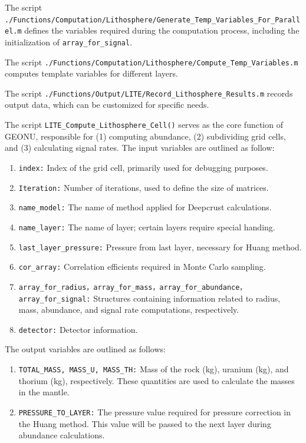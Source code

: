 			\par
			The script \texttt{./Functions/Computation/Lithosphere/Generate\_Temp\_Variables\_For\_Parallel.m} defines the variables required during the computation process, including the initialization of \texttt{array\_for\_signal}.\par
			The script \texttt{./Functions/Computation/Lithosphere/Compute\_Temp\_Variables.m} computes template variables for different layers.\par
			The script \texttt{./Functions/Output/LITE/Record\_Lithosphere\_Results.m} records output data, which can be customized for specific needs.\par
			The script \texttt{LITE\_Compute\_Lithosphere\_Cell()} serves as the core function of GEONU, responsible for (1) computing abundance, (2) subdividing grid cells, and (3) calculating signal rates. The input variables are outlined as follow:
				\begin{enumerate}
					\item \texttt{index:} Index of the grid cell, primarily used for debugging purposes.
					\item \texttt{Iteration:} Number of iterations, used to define the size of matrices.
					\item \texttt{name\_model:} The name of method applied for Deepcrust calculations.
					\item \texttt{name\_layer:} The name of layer; certain layers require special handing.
					\item \texttt{last\_layer\_pressure:} Pressure from last layer, necessary for Huang method.
					\item \texttt{cor\_array:} Correlation efficients required in Monte Carlo sampling.
					\item \texttt{array\_for\_radius，array\_for\_mass，array\_for\_abundance，array\_for\_signal:} Structures containing information related to radius, mass, abundance, and signal rate computations, respectively.
					\item \texttt{detector:} Detector information.
				\end{enumerate}
			The output variables are outlined as follows:
				\begin{enumerate}
					\item \texttt{TOTAL\_MASS, MASS\_U, MASS\_TH:} Mass of the rock (kg), uranium (kg), and thorium (kg), respectively. These quantities are used to calculate the masses in the mantle.
					\item \texttt{PRESSURE\_TO\_LAYER:} The pressure value required for pressure correction in the Huang method. This value will be passed to the next layer during abundance calculations.
				\end{enumerate}
